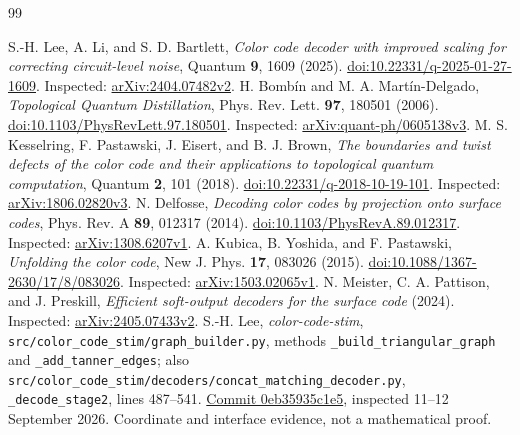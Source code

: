 \documentclass[11pt]{article}
\theoremstyle{definition}
\theoremstyle{plain}
\theoremstyle{remark}
\begin{document}



\begin{thebibliography}{99}
\raggedright
{}
S.-H. Lee, A. Li, and S. D. Bartlett,
\emph{Color code decoder with improved scaling for correcting circuit-level
noise}, Quantum \textbf{9}, 1609 (2025).
\href{https://doi.org/10.22331/q-2025-01-27-1609}{doi:10.22331/q-2025-01-27-1609}.
Inspected: \href{https://arxiv.org/abs/2404.07482v2}{arXiv:2404.07482v2}.
H. Bomb\'in and M. A. Mart\'in-Delgado,
\emph{Topological Quantum Distillation}, Phys. Rev. Lett.
\textbf{97}, 180501 (2006).
\href{https://doi.org/10.1103/PhysRevLett.97.180501}{doi:10.1103/PhysRevLett.97.180501}.
Inspected:
\href{https://arxiv.org/abs/quant-ph/0605138v3}{arXiv:quant-ph/0605138v3}.
M. S. Kesselring, F. Pastawski, J. Eisert, and B. J. Brown,
\emph{The boundaries and twist defects of the color code and their
applications to topological quantum computation}, Quantum \textbf{2},
101 (2018).
\href{https://doi.org/10.22331/q-2018-10-19-101}{doi:10.22331/q-2018-10-19-101}.
Inspected: \href{https://arxiv.org/abs/1806.02820v3}{arXiv:1806.02820v3}.
N. Delfosse, \emph{Decoding color codes by projection onto surface codes},
Phys. Rev. A \textbf{89}, 012317 (2014).
\href{https://doi.org/10.1103/PhysRevA.89.012317}{doi:10.1103/PhysRevA.89.012317}.
Inspected: \href{https://arxiv.org/abs/1308.6207v1}{arXiv:1308.6207v1}.
A. Kubica, B. Yoshida, and F. Pastawski, \emph{Unfolding the color code},
New J. Phys. \textbf{17}, 083026 (2015).
\href{https://doi.org/10.1088/1367-2630/17/8/083026}{doi:10.1088/1367-2630/17/8/083026}.
Inspected: \href{https://arxiv.org/abs/1503.02065v1}{arXiv:1503.02065v1}.
N. Meister, C. A. Pattison, and J. Preskill,
\emph{Efficient soft-output decoders for the surface code} (2024).
Inspected: \href{https://arxiv.org/abs/2405.07433v2}{arXiv:2405.07433v2}.
S.-H. Lee, \emph{color-code-stim},
\texttt{src/color\_code\_stim/graph\_builder.py},
methods \texttt{\_build\_triangular\_graph} and
\texttt{\_add\_tanner\_edges}; also
\texttt{src/color\_code\_stim/decoders/concat\_matching\_decoder.py},
\texttt{\_decode\_stage2}, lines 487--541.
\href{https://github.com/seokhyung-lee/color-code-stim/tree/0eb35935c1e5ff30ba3db9def30a9d35bca2f16d}{Commit 0eb35935c1e5},
inspected 11--12 September 2026. Coordinate and interface evidence,
not a mathematical proof.


\end{thebibliography}
\end{document}
